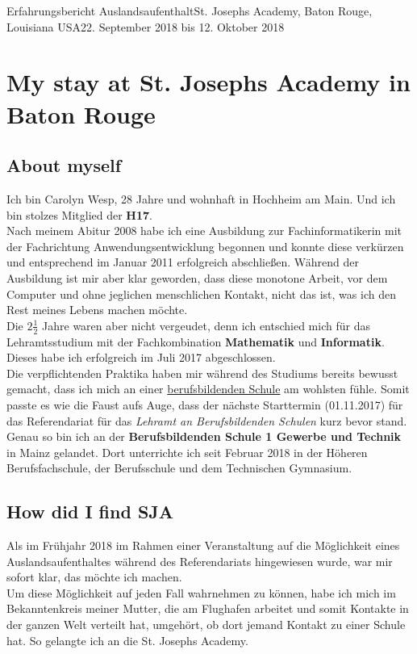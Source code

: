 \documentclass[oneside,openany,headings=optiontotoc,11pt,numbers=noenddot]{article}
\begin{document}
				
	\begin{worksheet}{Erfahrungsbericht Auslandsaufenthalt}{St. Joseph\grq{}s Academy, Baton Rouge, Louisiana USA}{22. September 2018 bis 12. Oktober 2018}
		\section*{My stay at St. Joseph\grq{}s Academy in Baton Rouge}
		\setcounter{section}{1}
		\subsection*{About myself}
		Ich bin Carolyn Wesp, 28 Jahre und wohnhaft in Hochheim am Main. Und ich bin stolzes Mitglied der \textbf{H17}.\\
		Nach meinem Abitur 2008 habe ich eine Ausbildung zur Fachinformatikerin mit der Fachrichtung Anwendungsentwicklung begonnen und konnte diese verkürzen und entsprechend im Januar 2011 erfolgreich abschließen. Während der Ausbildung ist mir aber klar geworden, dass diese monotone Arbeit, vor dem Computer und ohne jeglichen menschlichen Kontakt, nicht das ist, was ich den Rest meines Lebens machen möchte.\\
		Die \(2\frac{1}{2}\) Jahre waren aber nicht vergeudet, denn ich entschied mich für das Lehramtsstudium mit der Fachkombination \textbf{Mathematik} und \textbf{Informatik}. Dieses habe ich erfolgreich im Juli 2017 abgeschlossen.\\
		Die verpflichtenden Praktika haben mir während des Studiums bereits bewusst gemacht, dass ich mich an einer \underline{berufsbildenden Schule} am wohlsten fühle. Somit passte es wie die Faust auf\grq{}s Auge, dass der nächste Starttermin (01.11.2017) für das Referendariat für das \textit{Lehramt an Berufsbildenden Schulen} kurz bevor stand.\\
		Genau so bin ich an der \textbf{Berufsbildenden Schule 1 Gewerbe und Technik} in Mainz gelandet. Dort unterrichte ich seit Februar 2018 in der Höheren Berufsfachschule, der Berufsschule und dem Technischen Gymnasium.
		\subsection*{How did I find SJA}
		Als im Frühjahr 2018 im Rahmen einer Veranstaltung auf die Möglichkeit eines Auslandsaufenthaltes während des Referendariats hingewiesen wurde, war mir sofort klar, das möchte ich machen.\\
		Um diese Möglichkeit auf jeden Fall wahrnehmen zu können, habe ich mich im Bekanntenkreis meiner Mutter, die am Flughafen arbeitet und somit Kontakte in der ganzen Welt verteilt hat, umgehört, ob dort jemand Kontakt zu einer Schule hat. So gelangte ich an die St. Joseph\grq{}s Academy.

\end{worksheet}
\end{document}
